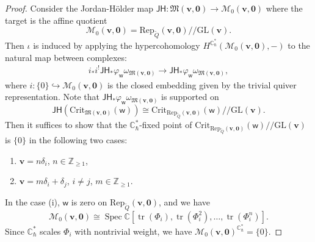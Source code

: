 \documentclass[10pt]{amsart}
\theoremstyle{definition}
\numberwithin{equation}{section}
\newcommand{\GL}{\mathrm{GL}}
\newcommand{\Crit}{\mathrm{Crit}}
\newcommand{\bC}{\mathbb{C}}
\newcommand{\bZ}{\mathbb{Z}}
\newcommand{\bv}{\mathbf{v}}
\newcommand{\cM}{\mathcal{M}}
\newcommand{\fM}{\mathfrak{M}}
\newcommand{\sw}{\mathsf{w}}
\newcommand{\Spec}{\operatorname{Spec}}
\newcommand{\tr}{\operatorname{tr}}
\begin{document}
\begin{proof}
Consider the Jordan-H\"older map $\mathsf{JH}\colon \fM(\bv,\mathbf 0)\to \cM_0(\bv,\mathbf 0)$ where the target is the affine quotient 
$$\cM_0(\bv,\mathbf 0)=\mathrm{Rep}_{\widetilde{Q}}(\bv,\mathbf 0)/\!\!/\GL(\bv). $$ 
Then $\iota$ is induced by applying the hypercohomology $H^{\bC^*_\hbar}(\cM_0(\bv,\mathbf 0),-)$ to the natural map between complexes:
\begin{align*}
    i_*i^!\mathsf{JH}_*\varphi_{\sw}\omega_{\fM(\bv,\mathbf 0)}\to \mathsf{JH}_*\varphi_{\sw}\omega_{\fM(\bv,\mathbf 0)},
\end{align*}
where $i\colon \{0\}\hookrightarrow \cM_0(\bv,\mathbf 0)$ is the closed embedding given by the trivial quiver representation. Note that $\mathsf{JH}_*\varphi_{\sw}\omega_{\fM(\bv,\mathbf 0)}$ is supported on 
$$\mathsf{JH}(\Crit_{\fM(\bv,\mathbf 0)}(\sw))\cong \Crit_{\mathrm{Rep}_{\widetilde{Q}}(\bv,\mathbf 0)}(\sw)/\!\!/\GL(\bv). $$ 
Then it suffices to show that the $\bC^*_\hbar$-fixed point of $\Crit_{\mathrm{Rep}_{\widetilde{Q}}(\bv,\mathbf 0)}(\sw)/\!\!/\GL(\bv)$ is $\{0\}$ in the following two cases:
\begin{enumerate}
    \item[(i)] $\bv=n\delta_i$, $n\in \bZ_{\geqslant 1}$,
    \item[(ii)] $\bv=m\delta_i+\delta_j$, $i\neq j$, $m\in \bZ_{\geqslant 1}$.
\end{enumerate}
In the case (i), $\sw$ is zero on $\mathrm{Rep}_{\widetilde{Q}}(\bv,\mathbf 0)$, and we have 
$$\cM_0(\bv,\mathbf 0)\cong \Spec\bC[\tr(\Phi_i),\tr(\Phi_i^2),\ldots,\tr(\Phi_i^n)]. $$ 
Since $\bC^*_\hbar$ scales $\Phi_i$ with nontrivial weight, we have $\cM_0(\bv,\mathbf 0)^{\bC^*_\hbar}=\{0\}$. 


\end{proof}
\end{document}
